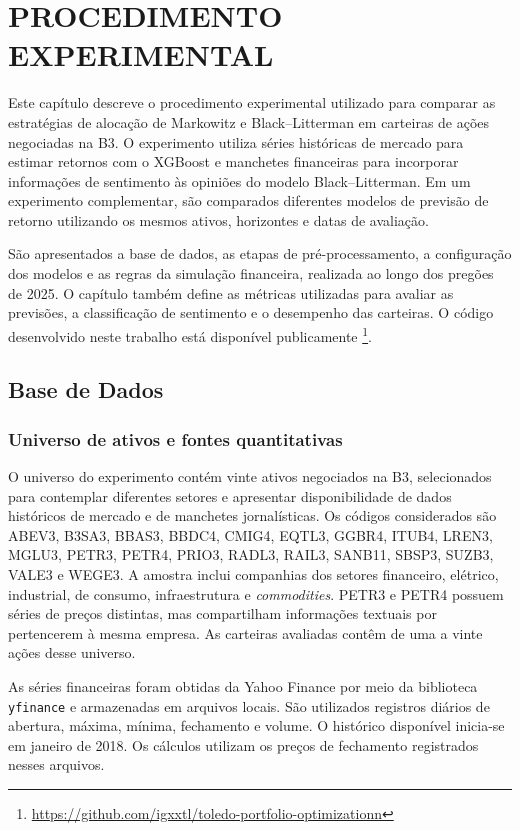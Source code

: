 \chapter{PROCEDIMENTO EXPERIMENTAL}
\label{cap:procedimento_experimental}

Este capítulo descreve o procedimento experimental utilizado para comparar as estratégias de alocação de Markowitz e Black--Litterman em carteiras de ações negociadas na B3. O experimento utiliza séries históricas de mercado para estimar retornos com o XGBoost e manchetes financeiras para incorporar informações de sentimento às opiniões do modelo Black--Litterman. Em um experimento complementar, são comparados diferentes modelos de previsão de retorno utilizando os mesmos ativos, horizontes e datas de avaliação.

São apresentados a base de dados, as etapas de pré-processamento,
a configuração dos modelos e as regras da simulação financeira,
realizada ao longo dos pregões de 2025. O capítulo também define
as métricas utilizadas para avaliar as previsões, a classificação
de sentimento e o desempenho das carteiras. O código desenvolvido
neste trabalho está disponível publicamente%
\footnote{\url{https://github.com/igxxtl/toledo-portfolio-optimizationn}}.

\section{Base de Dados}
\label{sec:base_dados}

\subsection{Universo de ativos e fontes quantitativas}

O universo do experimento contém vinte ativos negociados
na B3, selecionados para contemplar diferentes setores
e apresentar disponibilidade de dados históricos de
mercado e de manchetes jornalísticas. Os códigos
considerados são ABEV3, B3SA3, BBAS3, BBDC4, CMIG4, EQTL3,
GGBR4, ITUB4, LREN3, MGLU3, PETR3, PETR4, PRIO3, RADL3,
RAIL3, SANB11, SBSP3, SUZB3, VALE3 e WEGE3. A amostra inclui companhias dos setores financeiro, elétrico, industrial, de consumo, infraestrutura e \emph{commodities}. PETR3 e PETR4 possuem séries de preços distintas, mas compartilham informações textuais por pertencerem à mesma empresa. As carteiras avaliadas contêm de uma a vinte ações desse universo.

As séries financeiras foram obtidas da Yahoo Finance
por meio da biblioteca \texttt{yfinance} e armazenadas
em arquivos locais. São utilizados registros diários
de abertura, máxima, mínima, fechamento e volume.
O histórico disponível inicia-se em janeiro de 2018.
Os cálculos utilizam os preços de fechamento registrados
nesses arquivos.

